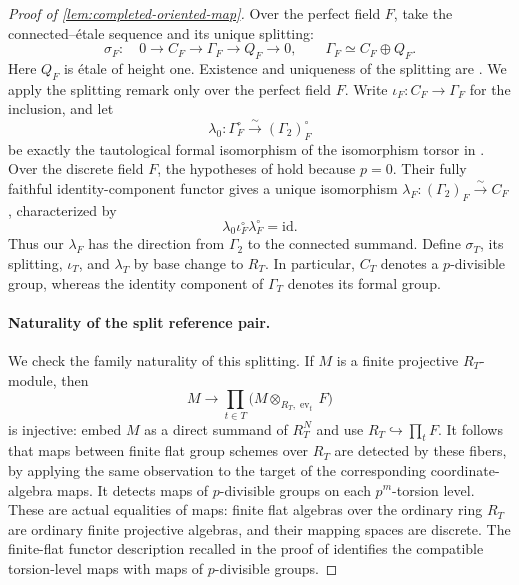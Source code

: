 \documentclass[11pt]{article}
\numberwithin{equation}{section}
\theoremstyle{definition}
\theoremstyle{remark}
\begin{document}
\begin{proof}[Proof of \cref{lem:completed-oriented-map}]
Over the perfect field \(F\), take the connected--étale sequence and its
unique splitting:
\[
 \sigma_F:\quad
 0\longrightarrow C_F\longrightarrow\Gamma_F
 \longrightarrow Q_F\longrightarrow0,
 \qquad \Gamma_F\simeq C_F\oplus Q_F .
\]
Here \(Q_F\) is étale of height one. Existence and uniqueness of the
splitting are
\cite[Proposition~2.5.20 and Remark~2.5.24]{LurieEllipticII2018}.
We apply the splitting remark only over the perfect field \(F\).
Write \(\iota_F:C_F\to\Gamma_F\) for the inclusion, and let
\[
 \lambda_0:\Gamma_F^\circ\xrightarrow{\sim}(\Gamma_2)_F^\circ
\]
be exactly the tautological formal isomorphism of the isomorphism torsor
in \cite[Example~4.6.3]{BMR2026}. Over the discrete field \(F\), the
hypotheses of
\cite[Theorem~2.3.12 and Corollary~2.3.13]{LurieEllipticII2018} hold because
\(p=0\). Their fully faithful identity-component functor gives a unique
isomorphism
\(\lambda_F:(\Gamma_2)_F\xrightarrow{\sim}C_F\), characterized by
\[
 \lambda_0\iota_F^\circ\lambda_F^\circ=\mathrm{id}.
\]
Thus our \(\lambda_F\) has the direction from \(\Gamma_2\) to the
connected summand. Define \(\sigma_T\), its splitting, \(\iota_T\), and
\(\lambda_T\) by base change to \(R_T\). In particular, \(C_T\) denotes
a \(p\)-divisible group, whereas the identity component of \(\Gamma_T\) denotes its formal group.

\paragraph{Naturality of the split reference pair.}
We check the family naturality of this splitting. If \(M\) is a finite
projective \(R_T\)-module, then
\[
 M\longrightarrow
 \prod_{t\in T}\bigl(M\otimes_{R_T,\operatorname{ev}_t}F\bigr)
\]
is injective: embed \(M\) as a direct summand of \(R_T^N\) and use
\(R_T\hookrightarrow\prod_tF\). It follows that maps between finite flat
group schemes over \(R_T\) are detected by these fibers, by applying the
same observation to the target of the corresponding coordinate-algebra
maps. It detects maps of \(p\)-divisible groups on each \(p^m\)-torsion
level. These are actual equalities of maps: finite flat algebras over the
ordinary ring \(R_T\) are ordinary finite projective algebras, and their
mapping spaces are discrete. The finite-flat functor description recalled
in the proof of \cite[Proposition~2.5.20]{LurieEllipticII2018} identifies
the compatible torsion-level maps with maps of \(p\)-divisible groups.


\end{proof}
\end{document}
